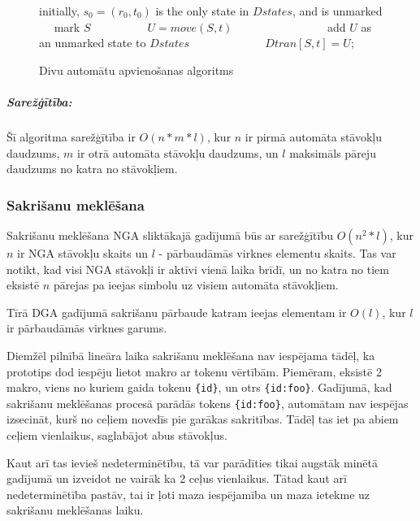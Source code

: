 \begin{figure}[h]
  \begin{algorithmic}
  \State initially, $s_0 = (r_0, t_0)$ is the only state in $Dstates$, and is unmarked
      \State mark $S$
       
          \State $U = move (S, t)$
              \State add $U$ as an unmarked state to $Dstates$
          \EndIf
          \State $Dtran [S, t] = U$;
      \EndFor
  \EndWhile
  \end{algorithmic}
  \caption{\label{fig:uni_algorithm}Divu automātu apvienošanas algoritms}
\end{figure}

\subparagraph{Sarežģītība:}
Šī algoritma sarežģītība ir $O(n*m*l)$, kur  $n$ ir pirmā automāta stāvokļu daudzums, $m$ ir otrā automāta stāvokļu daudzums, un $l$ maksimāls pāreju daudzums no katra no stāvokļiem.

\subsubsection{Sakrišanu meklēšana}
Sakrišanu meklēšana NGA sliktākajā gadījumā būs ar sarežģītību $O(n^2*l)$, kur $n$ ir NGA stāvokļu skaits un $l$ - pārbaudāmās virknes elementu skaits. Tas var notikt, kad visi NGA stāvokļi ir aktīvi vienā laika brīdī, un no katra no tiem eksistē $n$ pārejas pa ieejas simbolu uz visiem automāta stāvokļiem.

Tīrā DGA gadījumā sakrišanu pārbaude katram ieejas elementam ir $O(l)$, kur $l$ ir pārbaudāmās virknes garums. 

Diemžēl pilnībā lineāra laika sakrišanu meklēšana nav iespējama tādēļ, ka prototips dod iespēju lietot makro ar tokenu vērtībām. Piemēram, eksistē 2 makro, viens no kuriem gaida tokenu \verb|{id}|, un otrs \verb|{id:foo}|. Gadījumā, kad sakrišanu meklēšanas procesā parādās tokens \verb|{id:foo}|, automātam nav iespējas izsecināt, kurš no ceļiem novedīs pie garākas sakritības. Tādēļ tas iet pa abiem ceļiem vienlaikus, saglabājot abus stāvokļus.

Kaut arī tas ievieš nedeterminētību, tā var parādīties tikai augstāk minētā gadījumā un izveidot ne vairāk ka 2 ceļus vienlaikus. Tātad kaut arī nedeterminētība pastāv, tai ir ļoti maza iespējamība un maza ietekme uz sakrišanu meklēšanas laiku.

